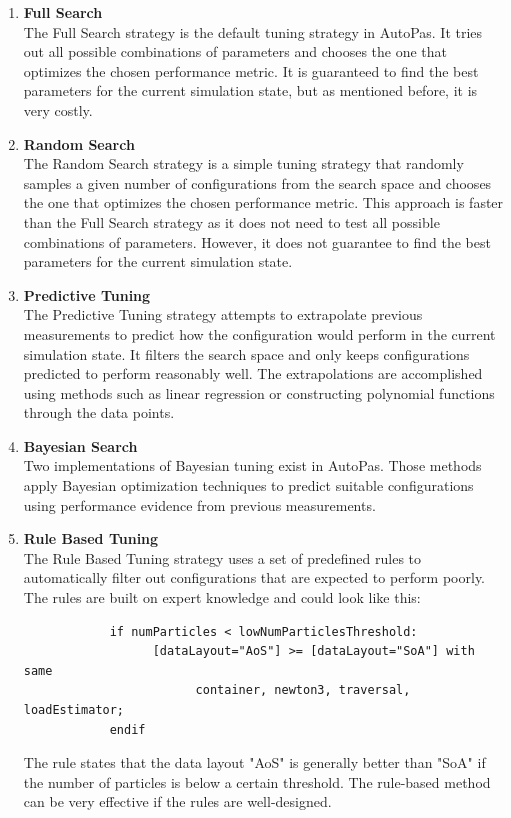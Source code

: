 \begin{enumerate}
      \item \textbf{Full Search} \\
            The Full Search strategy is the default tuning strategy in AutoPas. It tries out all possible combinations of parameters and chooses the one that optimizes the chosen performance metric. It is guaranteed to find the best parameters for the current simulation state, but as mentioned before, it is very costly.

      \item \textbf{Random Search} \\
            The Random Search strategy is a simple tuning strategy that randomly samples a given number of configurations from the search space and chooses the one that optimizes the chosen performance metric. This approach is faster than the Full Search strategy as it does not need to test all possible combinations of parameters. However, it does not guarantee to find the best parameters for the current simulation state.

      \item \textbf{Predictive Tuning} \\
            The Predictive Tuning strategy attempts to extrapolate previous measurements to predict how the configuration would perform in the current simulation state. It filters the search space and only keeps configurations predicted to perform reasonably well. The extrapolations are accomplished using methods such as linear regression or constructing polynomial functions through the data points.

      \item \textbf{Bayesian Search} \\
            Two implementations of Bayesian tuning exist in AutoPas. Those methods apply Bayesian optimization techniques to predict suitable configurations using performance evidence from previous measurements.

      \item \textbf{Rule Based Tuning} \\
            The Rule Based Tuning strategy uses a set of predefined rules to automatically filter out configurations that are expected to perform poorly. The rules are built on expert knowledge and could look like this:
            \begin{small}
                  \begin{verbatim}
            if numParticles < lowNumParticlesThreshold:
                  [dataLayout="AoS"] >= [dataLayout="SoA"] with same 
                        container, newton3, traversal, loadEstimator;
            endif
            \end{verbatim}
            \end{small}
            The rule states that the data layout "AoS" is generally better than "SoA" if the number of particles is below a certain threshold. The rule-based method can be very effective if the rules are well-designed.
\end{enumerate}


